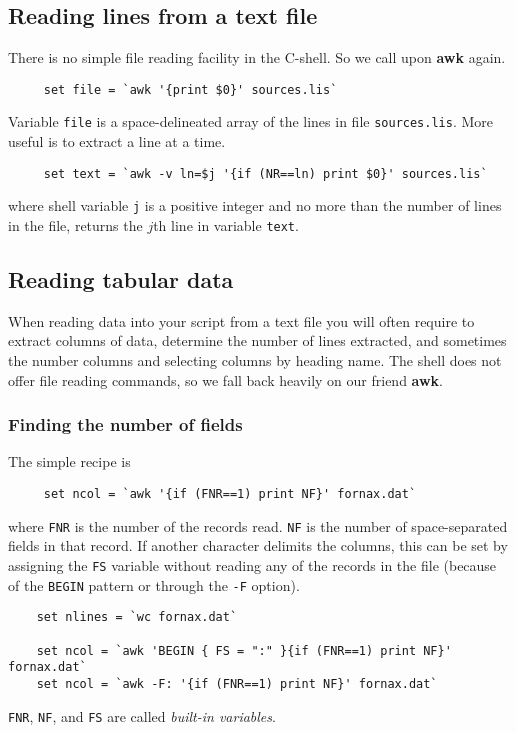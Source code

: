 \documentclass[twoside,11pt]{article}
\newcommand{\htmlref}[2]{#1}
\newcommand{\xlabel}[1]{}
\begin{document}
\subsection{\xlabel{sc4_se_read_lines}Reading lines from a text file\label{sc4_se_read_lines}}

There is no simple file reading facility in the C-shell.  So we call
upon {\bf awk} again.

\small
\begin{verbatim}
     set file = `awk '{print $0}' sources.lis`
\end{verbatim}
\normalsize
Variable {\tt file} is a space-delineated array of the lines in file
{\tt sources.lis}.  More useful is to extract a line at a time.

\small
\begin{verbatim}
     set text = `awk -v ln=$j '{if (NR==ln) print $0}' sources.lis`
\end{verbatim}
\normalsize
where \htmlref{{\sf shell variable}}{sc4_gl_she} {\tt j} is a positive
integer and no more than the number of lines in the file, returns the $j$th 
line in variable {\tt text}.

\newpage
\subsection{\xlabel{sc4_se_read_table}Reading tabular
data\label{sc4_se_read_table}}

When reading data into your script from a text file you will often
require to extract columns of data, determine the number of lines
extracted, and sometimes the number columns and selecting columns by
heading name.  The shell does not offer file reading commands, so we
fall back heavily on our friend {\bf awk}.

\subsubsection{\xlabel{sc4_se_find_nf}Finding the number of fields\label{sc4_se_find_nf}}

The simple recipe is
\small
\begin{verbatim}
     set ncol = `awk '{if (FNR==1) print NF}' fornax.dat`
\end{verbatim}
\normalsize
where {\tt FNR} is the number of the records read.  {\tt NF} is the number of
space-separated fields in that record.  If another character delimits
the columns, this can be set by assigning the {\tt FS} variable without
reading any of the records in the file (because of the {\tt BEGIN}
pattern or through the {\tt -F} option).
\small
\begin{verbatim}
    set nlines = `wc fornax.dat`
     
    set ncol = `awk 'BEGIN { FS = ":" }{if (FNR==1) print NF}' fornax.dat`
    set ncol = `awk -F: '{if (FNR==1) print NF}' fornax.dat`
\end{verbatim}
\normalsize
{\tt FNR}, {\tt NF}, and {\tt FS} are called {\em built-in variables}.
\end{document}
